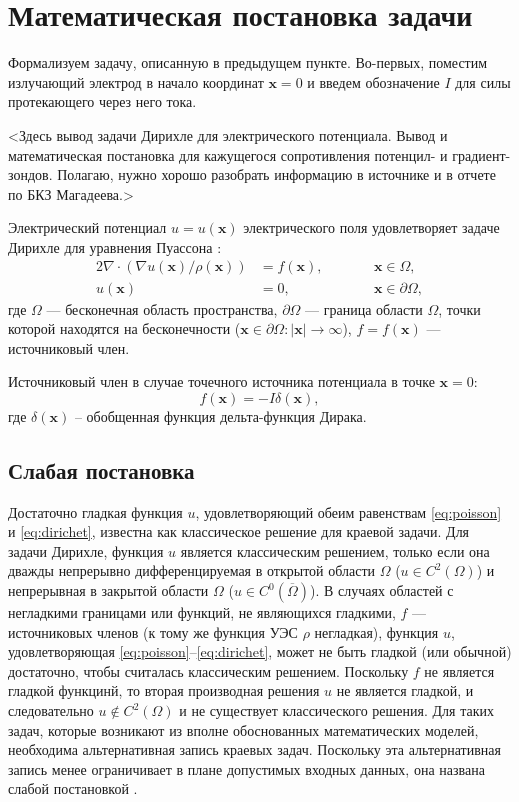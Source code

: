 \let\Omega\varOmega

\section{Математическая постановка задачи}

Формализуем задачу, описанную в предыдущем пункте. Во-первых, поместим
излучающий электрод в начало координат ${\bm x = 0}$ и введем обозначение $I$ для силы
протекающего через него тока.

<Здесь вывод задачи Дирихле для электрического потенциала. Вывод и математическая постановка для кажущегося сопротивления потенцил- и градиент-зондов. Полагаю, нужно хорошо разобрать информацию в источнике \cite{elec} и в отчете по БКЗ Магадеева.>

Электрический потенциал ${u = u(\bm x)}$ электрического поля удовлетворяет задаче Дирихле для уравнения Пуассона \cite[с. 67]{elec}:
\begin{alignat}{2}
\nabla \cdot (\nabla u(\bm x) / \rho(\bm x)) &= f(\bm x),\qquad && \bm x \in \Omega, \label{eq:poisson}\\
u(\bm x) &= 0, && \bm x \in \partial \Omega, \label{eq:dirichet}
\end{alignat}
где $\Omega$ --- бесконечная область пространства,
${\partial \Omega}$ --- граница области $\Omega$,
точки которой находятся на бесконечности (${\bm x \in \partial \Omega: |\bm x| \rightarrow \infty}$),
${f = f(\bm x)}$ --- источниковый член.

Источниковый член в случае точечного источника потенциала в точке ${\bm x = 0}$:
\begin{equation}
f(\bm x) = -I \delta(\bm x),
\end{equation}
где $\delta(\bm x)$ -- обобщенная функция дельта-функция Дирака.


\subsection{Слабая постановка}

Достаточно гладкая функция $u$, удовлетворяющий обеим равенствам \eqref{eq:poisson} и \eqref{eq:dirichet}, известна как классическое решение для краевой задачи. Для задачи Дирихле, функция $u$ является классическим решением, только если она дважды непрерывно дифференцируемая в открытой области $\Omega$ ($u \in C^2(\Omega)$) и непрерывная в закрытой области $\Omega$ ($u \in C^0(\overline \Omega)$). В случаях областей с негладкими границами или функций, не являющихся гладкими, $f$ --- источниковых членов (к тому же функция УЭС $\rho$ негладкая), функция $u$, удовлетворяющая \eqref{eq:poisson}--\eqref{eq:dirichet}, может не быть гладкой (или обычной) достаточно, чтобы считалась классическим решением. Поскольку $f$ не является гладкой функцинй, то вторая производная решения $u$ не является гладкой, и следовательно ${u \notin C^2(\Omega)}$ и не существует классического решения. Для таких задач, которые возникают из вполне обоснованных математических моделей, необходима альтернативная запись краевых задач. Поскольку эта альтернативная запись менее ограничивает в плане допустимых входных данных, она названа слабой постановкой \cite[с. 14]{FEFIS}.

